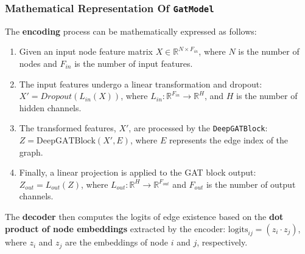 \documentclass[11pt]{article}
\begin{document}
	\subsubsection{Mathematical Representation Of \texttt{GatModel}}
	The \textbf{encoding} process can be mathematically expressed as follows:
	\begin{enumerate}
		\item Given an input node feature matrix $X \in \mathbb{R}^{N \times F_{in}}$, where $N$ is the number of nodes and $F_{in}$ is the number of input features.
	
		\item The input features undergo a linear transformation and dropout:\\ 
		$X' = Dropout(L_{in}(X))$, where $L_{in} : \mathbb{R}^{F_{in}} \to \mathbb{R}^{H}$, and $H$ is the number of hidden channels.
		
		\item The transformed features, $X'$, are processed by the \texttt{DeepGATBlock}:\\ 
		$Z = \text{DeepGATBlock}(X', E)$, where $E$ represents the edge index of the graph.
		
		\item Finally, a linear projection is applied to the GAT block output: $Z_{out} = L_{out}(Z)$, where $L_{out}: \mathbb{R}^H \to \mathbb{R}^{F_{out}}$ and $F_{out}$ is the number of output channels.
	\end{enumerate}
	The \textbf{decoder} then computes the logits of edge existence based on the \textbf{dot product of node embeddings} extracted by the encoder: $\text{logits}_{ij} = (z_i \cdot z_j)$, where $z_i$ and $z_j$ are the embeddings of node $i$ and $j$, respectively.
	
	
\end{document}
